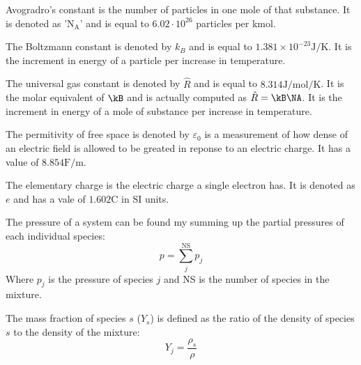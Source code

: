 \documentclass[10pt]{article}
\begin{document}
\begin{flushleft}
\begin{definition}
Avogradro's constant is the number of particles in one mole of that substance. It is denoted as '$\text{N}_\text{A}$' and is equal to $6.02 \cdot 10^{26}$ particles per \si{\kilo\mole}.    
\label{def:NA}
\end{definition}

\begin{definition}
The Boltzmann constant is denoted by $k_B$ and is equal to $1.381 \times 10^{-23} \si{\joule\per\kelvin}$. It is the increment in energy of a particle per increase in temperature.
\label{def:kB}
\end{definition}

\begin{definition}
The universal gas constant is denoted by $\hat{R}$ and is equal to $8.314 \si{\joule\per\mole\per\kelvin}$. It is the molar equivalent of $\kB$ and is actually computed as $\hat{R} = \kB \NA$. It is the increment in energy of a mole of substance per increase in temperature.
\label{def:Rhat}
\end{definition}

\begin{definition}
The permitivity of free space is denoted by $\varepsilon_0$ is a measurement of how dense of an electric field is allowed to be greated in reponse to an electric charge. It has a value of $8.854\si{\farad\per\meter}$.
\label{def:eps0}
\end{definition}

\begin{definition}
The elementary charge is the electric charge a single electron has. It is denoted as $e$ and has a vale of $1.602\si{\coulomb}$ in SI units.
\label{def:electronCharge}    
\end{definition}

\begin{definition}
The pressure of a system can be found my summing up the partial pressures of each individual species:
\begin{equation}
    p = \sum_j^\text{NS} p_j
\end{equation}
Where $p_j$ is the pressure of species $j$ and NS is the number of species in the mixture.
\end{definition}

\begin{definition}
The mass fraction of species $s$ ($Y_s$) is defined as the ratio of the density of species $s$ to the density of the mixture:
\begin{equation}
    Y_j = \frac{\rho_s}{\rho}
\end{equation}
\label{def:Ymass}
\end{definition}


\end{flushleft}
\end{document}
